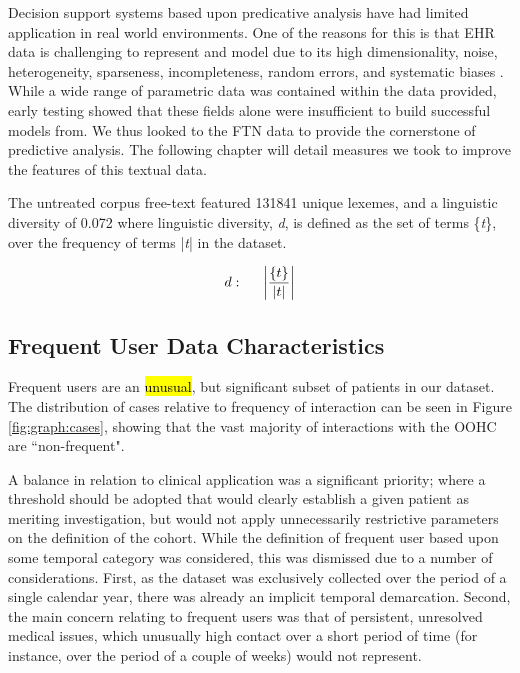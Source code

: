 
 


 Decision support systems based upon predicative analysis have had limited application in real world environments. One of the reasons for this is that EHR data is challenging to represent and model due to its high dimensionality, noise, heterogeneity, sparseness, incompleteness, random errors, and systematic biases \cite{botsis2010secondary}. While a wide range of parametric data was contained within the data provided, early testing showed that these fields alone were insufficient to build successful models from. We thus looked to the FTN data to provide the cornerstone of predictive analysis. The following chapter will detail measures we took to improve the features of this textual data.

The untreated corpus free-text featured 131841 unique lexemes, and a linguistic diversity of 0.072 where linguistic diversity, \textit{d}, is defined as the set of terms \{\textit{t}\}, over the frequency of terms |\textit{t}| in the dataset.

\begin{align}
d: \hspace*{5mm}\left |\frac{\{t\}}{|  t | }  \right |
\end{align}




 \subsection{Frequent User Data Characteristics }
 
 Frequent users are an \hl{unusual}, but significant subset of patients in our dataset. The distribution of cases relative to frequency of interaction can be seen in Figure \ref{fig:graph:cases}, showing that the vast majority of interactions with the OOHC are ``non-frequent". 
 
 A balance in relation to clinical application was a significant priority; where a threshold should be adopted that would clearly establish a given patient as meriting investigation, but would not apply unnecessarily restrictive parameters on the definition of the cohort.  While the definition of frequent user based upon some temporal category was considered, this was dismissed due to a number of considerations. First, as the dataset was exclusively collected over the period of a single calendar year, there was already an implicit temporal demarcation. Second, the main concern relating to frequent users was that of persistent, unresolved medical issues, which unusually high contact over a short period of time (for instance, over the period of a couple of weeks) would not represent.
 
